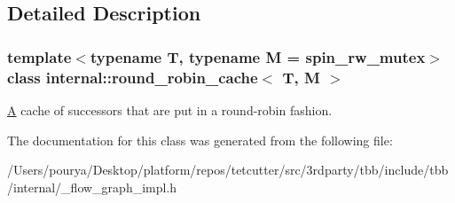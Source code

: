 \subsection{Detailed Description}
\subsubsection*{template$<$typename T, typename M = spin\+\_\+rw\+\_\+mutex$>$class internal\+::round\+\_\+robin\+\_\+cache$<$ T, M $>$}

\hyperlink{structA}{A} cache of successors that are put in a round-\/robin fashion. 

The documentation for this class was generated from the following file\+:\begin{DoxyCompactItemize}
\item 
/\+Users/pourya/\+Desktop/platform/repos/tetcutter/src/3rdparty/tbb/include/tbb/internal/\+\_\+flow\+\_\+graph\+\_\+impl.\+h\end{DoxyCompactItemize}
